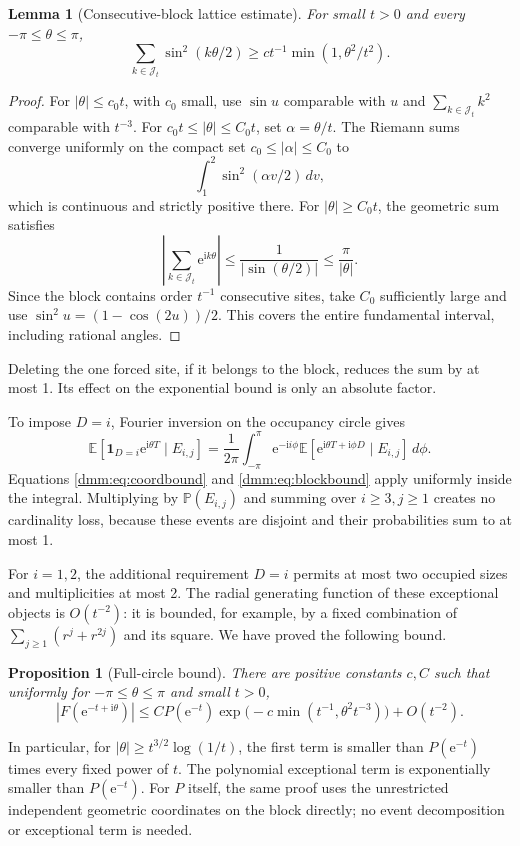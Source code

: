 \documentclass[11pt,letterpaper]{article}
\numberwithin{equation}{section}
\newtheorem{proposition}[theorem]{Proposition}
\newtheorem{lemma}[theorem]{Lemma}
\theoremstyle{definition}\newtheorem{definition}[theorem]{Definition}
\theoremstyle{remark}\newtheorem{remark}[theorem]{Remark}
\newcommand{\E}{\mathbb E}
\newcommand{\Prob}{\mathbb P}
\newcommand{\ii}{\mathrm i}
\newcommand{\ee}{\mathrm e}
\begin{document}
\begin{lemma}[Consecutive-block lattice estimate]\label{dmm:lem:block}
For small $t>0$ and every $-\pi\le\theta\le\pi$,
\begin{equation}\label{dmm:eq:blockbound}
\sum_{k\in\mathcal J_t}\sin^2(k\theta/2)
\ge c t^{-1}\min(1,\theta^2/t^2).
\end{equation}
\end{lemma}
\begin{proof}
For $|\theta|\le c_0t$, with $c_0$ small, use $\sin u$ comparable with $u$ and $\sum_{k\in\mathcal J_t}k^2$ comparable with $t^{-3}$. For $c_0t\le|\theta|\le C_0t$, set $\alpha=\theta/t$. The Riemann sums converge uniformly on the compact set $c_0\le|\alpha|\le C_0$ to
\[
\int_1^2\sin^2(\alpha v/2)\,dv,
\]
which is continuous and strictly positive there. For $|\theta|\ge C_0t$, the geometric sum satisfies
\[
\left|\sum_{k\in\mathcal J_t}\ee^{\ii k\theta}\right|
\le\frac1{|\sin(\theta/2)|}\le\frac\pi{|\theta|}.
\]
Since the block contains order $t^{-1}$ consecutive sites, take $C_0$ sufficiently large and use $\sin^2 u=(1-\cos(2u))/2$. This covers the entire fundamental interval, including rational angles.
\end{proof}
Deleting the one forced site, if it belongs to the block, reduces the sum by at most 1. Its effect on the exponential bound is only an absolute factor.

To impose $D=i$, Fourier inversion on the occupancy circle gives
\[
\E[\mathbf1_{D=i}\ee^{\ii\theta T}\mid E_{i,j}]
=\frac1{2\pi}\int_{-\pi}^{\pi}\ee^{-\ii i\phi}
\E[\ee^{\ii\theta T+\ii\phi D}\mid E_{i,j}]\,d\phi.
\]
Equations \eqref{dmm:eq:coordbound} and \eqref{dmm:eq:blockbound} apply uniformly inside the integral. Multiplying by $\Prob(E_{i,j})$ and summing over $i\ge3,j\ge1$ creates no cardinality loss, because these events are disjoint and their probabilities sum to at most 1.

For $i=1,2$, the additional requirement $D=i$ permits at most two occupied sizes and multiplicities at most 2. The radial generating function of these exceptional objects is $O(t^{-2})$: it is bounded, for example, by a fixed combination of $\sum_{j\ge1}(r^j+r^{2j})$ and its square. We have proved the following bound.

\begin{proposition}[Full-circle bound]\label{dmm:prop:global}
There are positive constants $c,C$ such that uniformly for $-\pi\le\theta\le\pi$ and small $t>0$,
\begin{equation}\label{dmm:eq:global}
|F(\ee^{-t+\ii\theta})|
\le C P(\ee^{-t})
\exp\bigl(-c\min(t^{-1},\theta^2t^{-3})\bigr)+O(t^{-2}).
\end{equation}
\end{proposition}
In particular, for $|\theta|\ge t^{3/2}\log(1/t)$, the first term is smaller than $P(\ee^{-t})$ times every fixed power of $t$. The polynomial exceptional term is exponentially smaller than $P(\ee^{-t})$. For $P$ itself, the same proof uses the unrestricted independent geometric coordinates on the block directly; no event decomposition or exceptional term is needed.
\end{document}
